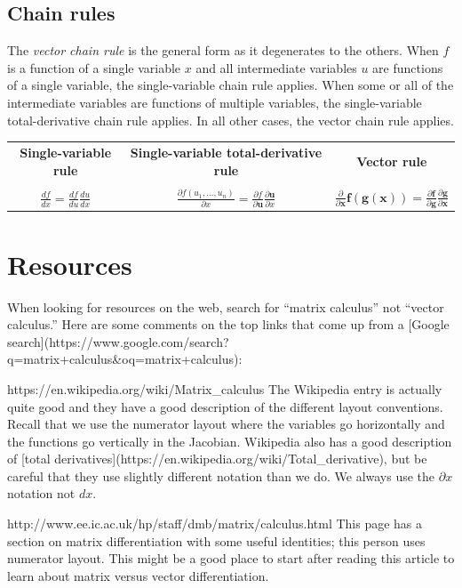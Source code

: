 \documentclass[11pt]{article}
\begin{document}
\subsection{Chain rules}

The {\em vector chain rule} is the general form as it degenerates to the others. When $f$ is a function of a single variable $x$ and all intermediate variables $u$ are functions of a single variable, the single-variable chain rule applies. When some or all of the intermediate variables are functions of multiple variables, the single-variable total-derivative chain rule applies. In all other cases, the vector chain rule applies.

\begin{tabular}{ccc}
\bf{Single-variable rule} & \bf{Single-variable total-derivative rule} & \bf{Vector  rule}\\\\

$\frac{df}{dx} = \frac{df}{du}\frac{du}{dx}$ &

$\frac{\partial f(u_1,\ldots,u_n)}{\partial x} = \frac{\partial f}{\partial \mathbf{u}} \frac{\partial \mathbf{u}}{\partial x}$ &

$\frac{\partial}{\partial \mathbf{x}} \mathbf{f}(\mathbf{g}(\mathbf{x})) = \frac{\partial \mathbf{f}}{\partial \mathbf{g}}\frac{\partial\mathbf{g}}{\partial \mathbf{x}}$
\end{tabular}


\section{Resources}

When looking for resources on the web, search for ``matrix calculus'' not ``vector calculus.''  Here are some comments on the top links that come up from a [Google search](https://www.google.com/search?q=matrix+calculus\&oq=matrix+calculus):

https://en.wikipedia.org/wiki/Matrix\_calculus The Wikipedia entry is actually quite good and they have a good description of the different layout conventions. Recall that we use the numerator layout where the variables go horizontally and the functions go vertically in the Jacobian. Wikipedia also has a good description of [total derivatives](https://en.wikipedia.org/wiki/Total\_derivative), but be careful that they use slightly different notation than we do. We always use the $\partial x$ notation not $dx$.

http://www.ee.ic.ac.uk/hp/staff/dmb/matrix/calculus.html This page has a section on matrix differentiation with some useful identities; this person uses numerator layout. This might be a good place to start after reading this article to learn about matrix versus vector differentiation.
\end{document}
